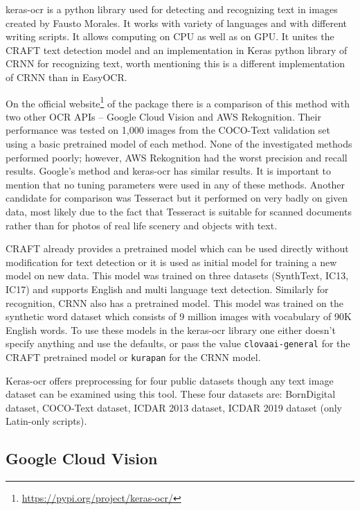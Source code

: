 keras-ocr is a python library used for detecting and recognizing text in images created by Fausto Morales. It works with variety of languages and with different writing scripts. It allows computing on CPU as well as on GPU.  It unites the CRAFT text detection model and an implementation in Keras python library of CRNN for recognizing text, worth mentioning this is a different implementation of CRNN than in EasyOCR.\cite{keras-ocr1}

On the official website\footnote{\url{https://pypi.org/project/keras-ocr/}} of the package there is a comparison of this method with two other OCR APIs -- Google Cloud Vision and AWS Rekognition. Their performance was tested on 1,000 images from the COCO-Text validation set using a basic pretrained model of each method. None of the investigated methods performed poorly; however, AWS Rekognition had the worst precision and recall results. Google's method and keras-ocr has similar results. It is important to mention that no tuning parameters were used in any of these methods. Another candidate for comparison was Tesseract but it performed on very badly on given data, most likely due to the fact that Tesseract is suitable for scanned documents rather than for photos of real life scenery and objects with text. \cite{keras-ocr1}

CRAFT already provides a pretrained model which can be used directly without modification for text detection or it is used as initial model for training a new model on new data. This model was trained on three datasets (SynthText, IC13, IC17) and supports English and multi language text detection.\cite{craft1}
Similarly for recognition, CRNN also has a pretrained model. This model was trained on the synthetic word dataset which consists of 9 million images with vocabulary of 90K English words.\cite{synth}
To use these models in the keras-ocr library one either doesn't specify anything and use the defaults, or pass the value \texttt{clovaai-general} for the CRAFT pretrained model or \texttt{kurapan} for the CRNN model.

Keras-ocr offers preprocessing for four public datasets though any text image dataset can be examined using this tool. These four datasets are: BornDigital dataset, COCO-Text dataset, ICDAR 2013 dataset, ICDAR 2019 dataset (only Latin-only scripts).\cite{keras-ocrDocu}


\subsection{Google Cloud Vision}

